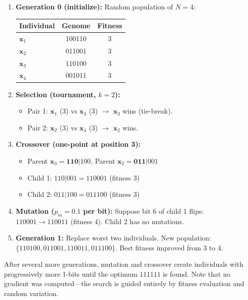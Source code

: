 \begin{enumerate}[leftmargin=1.5em]
\item \textbf{Generation 0 (initialize):} Random population of $N=4$:
\begin{center}
\begin{tabular}{lcc}
\toprule
\textbf{Individual} & \textbf{Genome} & \textbf{Fitness} \\
\midrule
$\mathbf{x}_1$ & 100110 & 3 \\
$\mathbf{x}_2$ & 011001 & 3 \\
$\mathbf{x}_3$ & 110100 & 3 \\
$\mathbf{x}_4$ & 001011 & 3 \\
\bottomrule
\end{tabular}
\end{center}

\item \textbf{Selection (tournament, $k=2$):}
  \begin{itemize}
    \item Pair 1: $\mathbf{x}_1$ (3) vs $\mathbf{x}_3$ (3) $\to$ $\mathbf{x}_3$ wins (tie-break).
    \item Pair 2: $\mathbf{x}_2$ (3) vs $\mathbf{x}_4$ (3) $\to$ $\mathbf{x}_2$ wins.
  \end{itemize}

\item \textbf{Crossover (one-point at position 3):}
  \begin{itemize}
    \item Parent $\mathbf{x}_3 = \mathbf{110}|100$, Parent $\mathbf{x}_2 = \mathbf{011}|001$
    \item Child 1: $110|001 = 110001$ (fitness 3)
    \item Child 2: $011|100 = 011100$ (fitness 3)
  \end{itemize}

\item \textbf{Mutation ($p_m = 0.1$ per bit):} Suppose bit 6 of child 1 flips: $110001 \to 110011$ (fitness 4). Child 2 has no mutations.

\item \textbf{Generation 1:} Replace worst two individuals. New population: $\{110100, 011001, 110011, 011100\}$. Best fitness improved from 3 to 4.
\end{enumerate}

After several more generations, mutation and crossover create individuals with progressively more 1-bits until the optimum $111111$ is found. Note that no gradient was computed---the search is guided entirely by fitness evaluation and random variation.

